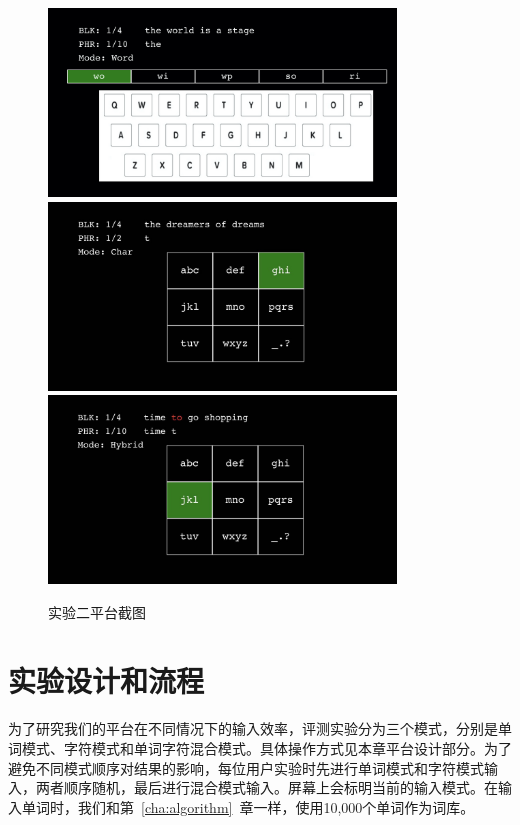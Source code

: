 \begin{figure}[h]
  \centering%
    {\includegraphics[height=5cm]{figures/platform11.jpg}}%
  \hspace{4em}%
      {\includegraphics[height=5cm]{figures/platform12.jpg}}
  \hspace{4em}%
      {\includegraphics[height=5cm]{figures/platform13.jpg}}
  \caption{实验二平台截图}
  \label{fig:platform1}
\end{figure}



\section{实验设计和流程}
为了研究我们的平台在不同情况下的输入效率，评测实验分为三个模式，分别是单词模式、字符模式和单词字符混合模式。具体操作方式见本章平台设计部分。为了避免不同模式顺序对结果的影响，每位用户实验时先进行单词模式和字符模式输入，两者顺序随机，最后进行混合模式输入。屏幕上会标明当前的输入模式。在输入单词时，我们和第~\ref{cha:algorithm}~章一样，使用10,000个单词作为词库。

